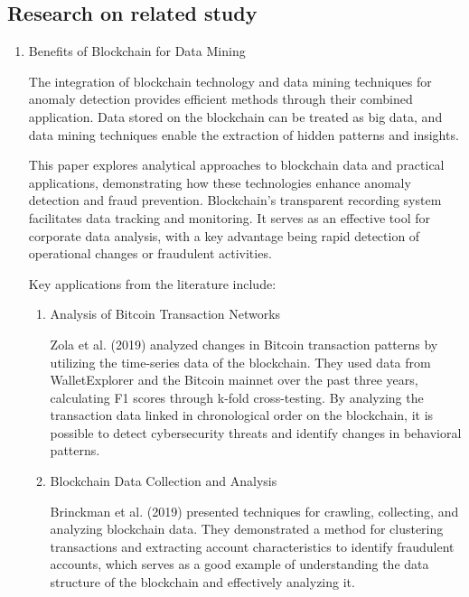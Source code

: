 \documentclass[conference]{IEEEtran}
\begin{document}
\subsection{Research on related study}

\begin{enumerate}[itemsep=2ex, parsep=1ex]
	\item Benefits of Blockchain for Data Mining
	      	      
	      The integration of blockchain technology and data mining techniques for anomaly detection provides efficient methods through their combined application. Data stored on the blockchain can be treated as big data, and data mining techniques enable the extraction of hidden patterns and insights.
	      	      
	      This paper explores analytical approaches to blockchain data and practical applications, demonstrating how these technologies enhance anomaly detection and fraud prevention. Blockchain's transparent recording system facilitates data tracking and monitoring. It serves as an effective tool for corporate data analysis, with a key advantage being rapid detection of operational changes or fraudulent activities.
	      	      
	      Key applications from the literature include:
	      	      
	      \begin{enumerate}[itemsep=2ex, parsep=1ex]
	      	\item Analysis of Bitcoin Transaction Networks
	      	      	      	      
	      	      Zola et al. (2019) analyzed changes in Bitcoin transaction patterns by utilizing the time-series data of the blockchain. They used data from WalletExplorer and the Bitcoin mainnet over the past three years, calculating F1 scores through k-fold cross-testing. By analyzing the transaction data linked in chronological order on the blockchain, it is possible to detect cybersecurity threats and identify changes in behavioral patterns.
	      	      	      	      
	      	\item Blockchain Data Collection and Analysis
	      	      	      	      
	      	      Brinckman et al. (2019) presented techniques for crawling, collecting, and analyzing blockchain data. They demonstrated a method for clustering transactions and extracting account characteristics to identify fraudulent accounts, which serves as a good example of understanding the data structure of the blockchain and effectively analyzing it.
	      	      	      	      

\end{enumerate}
\end{enumerate}
\end{document}
